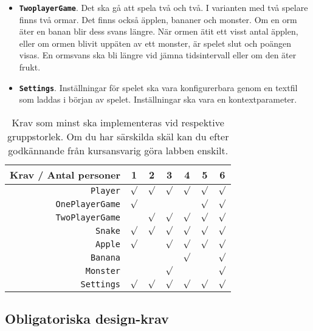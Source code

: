 \begin{itemize}[nosep, label={$\square$},]
\item \textbf{\texttt{TwoplayerGame}}. Det ska gå att spela två och två. I varianten med två spelare finns två ormar. Det finns också äpplen, bananer och monster. Om en orm äter en banan blir dess svans längre. När ormen ätit ett visst antal äpplen, eller om ormen blivit uppäten av ett monster, är spelet slut och poängen visas. En ormsvans ska bli längre vid jämna tidsintervall eller om den äter frukt.

\item \textbf{\texttt{Settings}}. Inställningar för spelet ska vara konfigurerbara genom en textfil som laddas i början av spelet. Inställningar ska vara en kontextparameter.  

\end{itemize}
\begin{table}[H]
  \centering
  \caption{Krav som minst ska implementeras vid respektive gruppstorlek. Om du har särskilda skäl kan du efter godkännande från kursansvarig göra labben enskilt.  \label{lab:snak:table-reqt}}

\begin{tabular}{r | c c c c c c}
  Krav / Antal personer & 1       & 2       & 3       & 4       & 5       & 6 \\ \hline
  \texttt{Player}       & $\surd$ & $\surd$ & $\surd$ & $\surd$ & $\surd$ & $\surd$ \\
  \texttt{OnePlayerGame}& $\surd$ &         &         &         & $\surd$ & $\surd$ \\
  \texttt{TwoPlayerGame}&         & $\surd$ & $\surd$ & $\surd$ & $\surd$ & $\surd$ \\
  \texttt{Snake}        & $\surd$ & $\surd$ & $\surd$ & $\surd$ & $\surd$ & $\surd$ \\
  \texttt{Apple}        & $\surd$ &         & $\surd$ & $\surd$ & $\surd$ & $\surd$ \\
  \texttt{Banana}       &         &         &         & $\surd$ &         & $\surd$ \\
  \texttt{Monster}      &         &         & $\surd$ &         &         & $\surd$ \\
  \texttt{Settings}     & $\surd$ & $\surd$ & $\surd$ & $\surd$ & $\surd$ & $\surd$ \\
\end{tabular}
\end{table}

\subsection{Obligatoriska design-krav}

